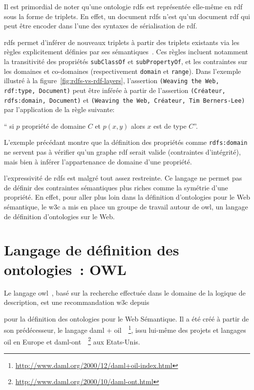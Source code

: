 Il est primordial de noter qu'une ontologie \acrshort{rdfs} est
représentée elle-même en \acrshort{rdf} sous la forme de triplets. En
effet, un document \acrshort{rdfs} n'est qu'un document \acrshort{rdf}
qui peut être encoder dans l'une des syntaxes de sérialisation de
\acrshort{rdf}.\medskip

\acrshort{rdfs} permet d'inférer de nouveaux triplets à partir des
triplets existants via les règles explicitement définies par ses
sémantiques~\cite{hayes2004rdf}. Ces règles incluent notamment la
transitivité des propriétés \texttt{subClassOf} et
\texttt{subPropertyOf}, et les contraintes sur les domaines et
co-domaines (respectivement \texttt{domain} et \texttt{range}). Dans
l'exemple illustré à la figure~\ref{fig:rdfs-vs-rdf-layers},
l'assertion \texttt{(Weaving the Web, rdf:type, Document)} peut être
inférée à partir de l'assertion \texttt{(Créateur, rdfs:domain,
  Document)} et \texttt{(Weaving the Web, Créateur, Tim Berners-Lee)}
par l'application de la règle suivante:\smallskip

`` si $p$ propriété de domaine $C$ et $p(x, y)$ alors $x$ est de type
$C$''.\medskip

L'exemple précédant montre que la définition des propriétés comme
\texttt{rdfs:domain} ne servent pas à vérifier qu'un graphe
\acrshort{rdf} serait valide (contraintes d'intégrité), mais bien à
inférer l'appartenance de domaine d'une propriété.\medskip

l'expressivité de \acrshort{rdfs} est malgré tout assez restreinte. Ce
langage ne permet pas de définir des contraintes sémantiques plus
riches comme la symétrie d'une propriété. En effet, pour aller plus
loin dans la définition d'ontologies pour le Web sémantique, le
\acrshort{w3c} a mis en place un groupe de travail autour de
\acrshort{owl}, un langage de définition d'ontologies sur le
Web.\medskip

\section{Langage de définition des ontologies~: OWL}
\label{sec:semantic-web-owl}

Le langage \acrshort{owl}~\cite{mcguinness2004owl}, basé sur la
recherche effectuée dans le domaine de la logique de description, est
une recommandation \acrshort{w3c} depuis \date{2004} pour la
définition des ontologies pour le Web Sémantique. Il a été créé à
partir de son prédécesseur, le langage \acrshort{daml} +
\acrshort{oil}~\cite{
  horrocks2002daml+oil}~\footnote{\url{http://www.daml.org/2000/12/daml+oil-index.html}},
issu lui-même des projets et langages
\acrshort{oil}\cite{horrocks2000ontology} en Europe et
\acrshort{daml-ont}~\cite{mcguinness2003daml}~\footnote{\url{http://www.daml.org/2000/10/daml-ont.html}}
aux Etats-Unis.\medskip

